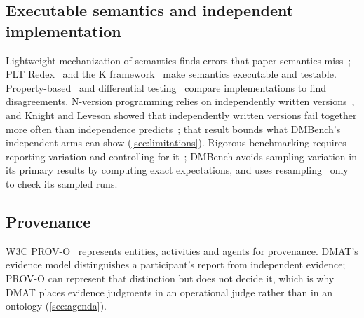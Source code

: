 \subsection{Executable semantics and independent implementation}

Lightweight mechanization of semantics finds errors that paper semantics miss~\cite{klein2012run}; PLT Redex~\cite{felleisen2009redex} and the K framework~\cite{rosu2010overview} make semantics executable and testable. Property-based~\cite{claessen2000quickcheck} and differential testing~\cite{mckeeman1998differential} compare implementations to find disagreements. N-version programming relies on independently written versions~\cite{avizienis1985nversion}, and Knight and Leveson showed that independently written versions fail together more often than independence predicts~\cite{knight1986experimental}; that result bounds what DMBench's independent arms can show (\cref{sec:limitations}). Rigorous benchmarking requires reporting variation and controlling for it~\cite{kalibera2013rigorous}; DMBench avoids sampling variation in its primary results by computing exact expectations, and uses resampling~\cite{efron1979bootstrap} only to check its sampled runs.

\subsection{Provenance}

W3C PROV-O~\cite{w3c2013provo} represents entities, activities and agents for provenance. DMAT's evidence model distinguishes a participant's report from independent evidence; PROV-O can represent that distinction but does not decide it, which is why DMAT places evidence judgments in an operational judge rather than in an ontology (\cref{sec:agenda}).
